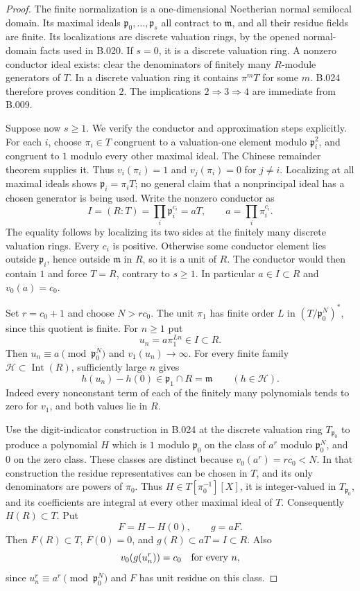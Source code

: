 \begin{proof}
The finite normalization is a one-dimensional Noetherian normal
semilocal domain. Its maximal ideals
$\mathfrak p_0,\ldots,\mathfrak p_s$ all contract to
$\mathfrak m$, and all their residue fields are finite.
Its localizations are discrete valuation rings, by the opened
normal-domain facts used in B.020. If $s=0$, it is a discrete
valuation ring. A nonzero conductor ideal exists: clear the
denominators of finitely many $R$-module generators of $T$.
In a discrete valuation ring it contains $\pi^mT$ for some $m$.
B.024 therefore proves condition 2. The implications
$2\Rightarrow3\Rightarrow4$ are immediate from B.009.

Suppose now $s\ge1$. We verify the conductor and approximation
steps explicitly. For each $i$, choose $\pi_i\in T$ congruent
to a valuation-one element modulo $\mathfrak p_i^2$, and
congruent to $1$ modulo every other maximal ideal. The Chinese
remainder theorem supplies it. Thus
$v_i(\pi_i)=1$ and $v_j(\pi_i)=0$ for $j\ne i$.
Localizing at all maximal ideals shows
$\mathfrak p_i=\pi_iT$; no general claim that a nonprincipal
ideal has a chosen generator is being used.
Write the nonzero conductor as
\[
 I=(R:T)=\prod_i\mathfrak p_i^{c_i}=aT,
 \qquad a=\prod_i\pi_i^{c_i}.
\]
The equality follows by localizing its two sides at the finitely
many discrete valuation rings. Every $c_i$ is positive. Otherwise
some conductor element lies outside $\mathfrak p_i$, hence outside
$\mathfrak m$ in $R$, so it is a unit of $R$. The conductor would
then contain $1$ and force $T=R$, contrary to $s\ge1$.
In particular $a\in I\subset R$ and $v_0(a)=c_0$.

Set $r=c_0+1$ and choose $N>r c_0$.
The unit $\pi_1$ has finite order $L$ in
$(T/\mathfrak p_0^N)^*$, since this quotient is finite.
For $n\ge1$ put
\[
 u_n=a\pi_1^{Ln}\in I\subset R.
\]
Then $u_n\equiv a\pmod{\mathfrak p_0^N}$ and
$v_1(u_n)\longrightarrow\infty$. For every finite family
$\mathcal H\subset\operatorname{Int}(R)$, sufficiently large $n$
gives
\[
 h(u_n)-h(0)\in\mathfrak p_1\cap R=\mathfrak m
 \qquad(h\in\mathcal H).
\]
Indeed every nonconstant term of each of the finitely many
polynomials tends to zero for $v_1$, and both
values lie in $R$.

Use the digit-indicator construction in B.024 at the discrete
valuation ring $T_{\mathfrak p_0}$ to produce a polynomial $H$
which is $1$ modulo $\mathfrak p_0$ on the class of $a^r$ modulo
$\mathfrak p_0^N$, and $0$ on the zero class. These classes are
distinct because $v_0(a^r)=r c_0<N$. In that construction the
residue representatives can be chosen in $T$, and its only
denominators are powers of $\pi_0$. Thus
$H\in T[\pi_0^{-1}][X]$, it is integer-valued in
$T_{\mathfrak p_0}$, and its coefficients are integral at every
other maximal ideal of $T$. Consequently $H(R)\subset T$.
Put
\[
 F=H-H(0),\qquad g=aF.
\]
Then $F(R)\subset T$, $F(0)=0$, and
$g(R)\subset aT=I\subset R$. Also
\[
 v_0(g(u_n^r))=c_0\quad\hbox{for every }n,
\]
since $u_n^r\equiv a^r\pmod{\mathfrak p_0^N}$ and $F$ has
unit residue on this class.


\end{proof}
